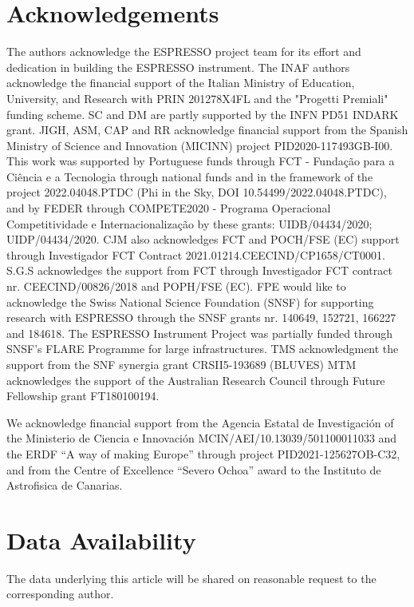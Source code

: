 \documentclass[fleqn,usenatbib]{mnras}
\begin{document}
\section*{Acknowledgements}
The authors acknowledge the ESPRESSO project team for its effort and dedication in building the ESPRESSO instrument.
The INAF authors acknowledge the financial support of the Italian Ministry of Education, University, and Research with PRIN 201278X4FL and the "Progetti Premiali" funding scheme. 
SC and DM are partly supported by the INFN PD51 INDARK grant.
JIGH, ASM, CAP and RR acknowledge financial support from the Spanish Ministry of Science and Innovation (MICINN) project PID2020-117493GB-I00.
This work was supported by Portuguese funds through FCT - Funda\c c\~ao para a Ci\^encia e a Tecnologia through national funds and in the framework of the project 2022.04048.PTDC (Phi in the Sky, DOI 10.54499/2022.04048.PTDC), 
and by FEDER through COMPETE2020 - Programa Operacional Competitividade e Internacionalização by these grants: UIDB/04434/2020; UIDP/04434/2020.
CJM also acknowledges FCT and POCH/FSE (EC) support through Investigador FCT Contract 2021.01214.CEECIND/CP1658/CT0001. 
S.G.S acknowledges the support from FCT through Investigador FCT contract nr. CEECIND/00826/2018 and  POPH/FSE (EC).
FPE would like to acknowledge the Swiss National Science Foundation (SNSF) for supporting research with ESPRESSO through the SNSF grants nr. 140649, 152721, 166227 and 184618. The ESPRESSO Instrument Project was partially funded through SNSF’s FLARE Programme for large infrastructures. 
TMS acknowledgment the support from the SNF synergia grant CRSII5-193689 (BLUVES)
MTM acknowledges the support of the Australian Research Council through Future Fellowship grant FT180100194.

We acknowledge financial support from the Agencia Estatal de Investigaci\'on of the Ministerio de Ciencia e Innovaci\'on MCIN/AEI/10.13039/501100011033 and the ERDF “A way of making Europe” through project PID2021-125627OB-C32, and from the Centre of Excellence “Severo Ochoa” award to the Instituto de Astrofisica de Canarias.

\section*{Data Availability}
The data underlying this article will be shared on reasonable request to the corresponding author.







\appendix
\onecolumn






\bsp	%
\label{lastpage}
\end{document}
